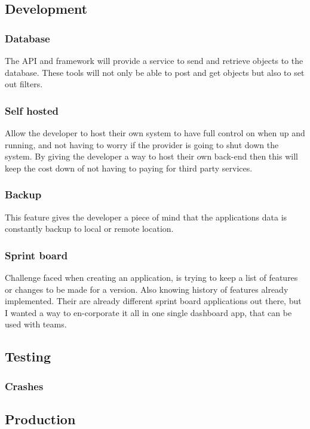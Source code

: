 \subsection{Development}

\subsubsection{Database}

The API and framework will provide a service to send and retrieve objects to the  database. These tools will not only be able to post and get objects but also to set out filters.

\subsubsection{Self hosted}
Allow the developer to host their own system to have full control on when up and running, and not having to worry if the provider is going to shut down the system. By giving the developer a way to host their own back-end then this will keep the cost down of not having to paying for third party services.

\subsubsection{Backup}
This feature gives the developer a piece of mind that the applications data is constantly backup to local or remote location.

\subsubsection{Sprint board}
Challenge faced when creating an application, is trying to keep a list of features or changes to be made for a version. Also knowing history of features already implemented. Their are already different sprint board applications out there, but I wanted a way to en-corporate it all in one single dashboard app, that can be used with teams.

\subsection{Testing}

\subsubsection{Crashes}

\subsection{Production}

